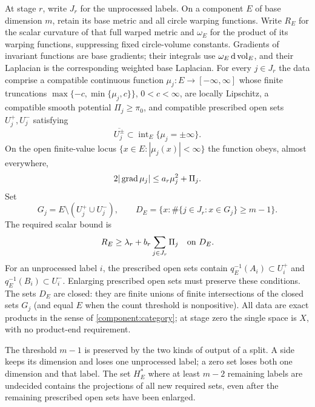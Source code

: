 \begin{definition}\label{component:invariant}
At stage $r$, write $J_r$ for the unprocessed labels.  On a component $E$
of base dimension $m$, retain its base metric and all circle warping functions.
Write $R_E$ for the scalar curvature of that full warped metric and
$\omega_E$ for the product of its warping functions, suppressing fixed
circle-volume constants.  Gradients of invariant functions are base
gradients; their integrals use $\omega_E\,\mathrm d\operatorname{vol}_E$, and their
Laplacian is the corresponding weighted base Laplacian.
For every $j\in J_r$ the data comprise a compatible continuous function
$\mu_j:E\to[-\infty,\infty]$ whose finite truncations
$\max\{-c,\min\{\mu_j,c\}\}$, $0<c<\infty$, are locally Lipschitz,
a compatible smooth potential $\Pi_j\ge\pi_0$, and compatible prescribed
open sets $U_j^+,U_j^-$ satisfying
\begin{equation}\label{component:open-set-poles}
 \overline{U_j^\pm}\subset
 \operatorname{int}_E\{\mu_j=\pm\infty\}.
\end{equation}
On the open finite-value locus $\{x\in E:|\mu_j(x)|<\infty\}$ the function
obeys, almost everywhere,
\begin{equation}\label{component:function}
 2|\operatorname{grad}\mu_j|\le a_r\mu_j^2+\Pi_j.
\end{equation}
Set
\begin{equation}\label{component:required-set}
 G_j=E\setminus(U_j^+\cup U_j^-),\qquad
 D_E=\bigl\{x:\#\{j\in J_r:x\in G_j\}\ge m-1\bigr\}.
\end{equation}
The required scalar bound is
\begin{equation}\label{component:curvature}
 R_E\ge\lambda_r+b_r\sum_{j\in J_r}\Pi_j
       \quad\hbox{on }D_E.
\end{equation}
For an unprocessed label $i$, the prescribed open sets contain
$q_E^{-1}(A_i)\subset U_i^+$ and
$q_E^{-1}(B_i)\subset U_i^-$.  Enlarging prescribed open sets must preserve these
conditions.  The sets $D_E$ are closed: they are finite unions of finite intersections
of the closed sets $G_j$ (and equal $E$ when the count threshold is
nonpositive).  All data are exact products
in the sense of \cref{component:category}; at stage zero the single
space is $X$, with no product-end requirement.
\end{definition}

The threshold $m-1$ is preserved by the two kinds of output of a
split. A side keeps its dimension and loses one unprocessed label;
a zero set loses both one dimension and that label. The set $H_E^*$ where at least $m-2$ remaining labels are undecided contains the projections of all new required
sets, even after the remaining prescribed open sets have been enlarged.

